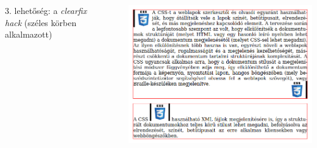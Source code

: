 \begin{frame}
\begin{columns}[c]
\begin{exampleblock}{}
      \end{exampleblock}
  \end{columns}
\end{frame}

\begin{frame}
  \begin{columns}[c]
      3. lehetőség: a \emph{clearfix hack} (széles körben alkalmazott)
      \begin{exampleblock}{}
        \scriptsize
        
        
      \end{exampleblock}
      \includegraphics[width=\textwidth]{lebeg5.png}
  \end{columns}
\end{frame}

